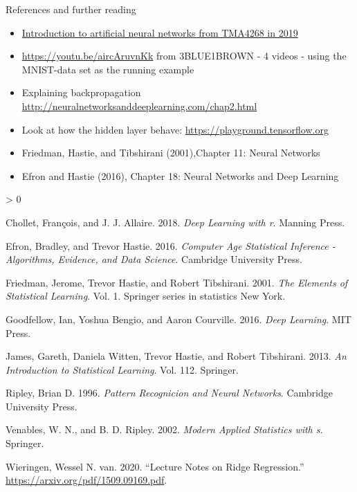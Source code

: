 \documentclass[
  ignorenonframetext,
]{beamer}
\providecommand{\tightlist}{%
  \setlength{\itemsep}{0pt}\setlength{\parskip}{0pt}}
\newlength{\cslhangindent}
\newenvironment{CSLReferences}[2] %
 {%
  \setlength{\parindent}{0pt}
  \ifodd #1 \everypar{\setlength{\hangindent}{\cslhangindent}}\ignorespaces\fi
  \ifnum #2 > 0
  \setlength{\parskip}{#2\baselineskip}
  \fi
 }%
 {}
\begin{document}
\begin{frame}{References and further reading}
\protect\hypertarget{references-and-further-reading}{}
\begin{itemize}
\tightlist
\item
  \href{https://www.math.ntnu.no/emner/TMA4268/2019v/11Nnet/11Nnet.html}{Introduction
  to artificial neural networks from TMA4268 in 2019}
\item
  \url{https://youtu.be/aircAruvnKk} from 3BLUE1BROWN - 4 videos - using
  the MNIST-data set as the running example
\item
  Explaining backpropagation
  \url{http://neuralnetworksanddeeplearning.com/chap2.html}
\item
  Look at how the hidden layer behave:
  \url{https://playground.tensorflow.org}
\item
  Friedman, Hastie, and Tibshirani (2001),Chapter 11: Neural Networks
\item
  Efron and Hastie (2016), Chapter 18: Neural Networks and Deep Learning
\end{itemize}

\hypertarget{refs}{}
\begin{CSLReferences}{1}{0}
\leavevmode\hypertarget{ref-kerasR}{}%
Chollet, François, and J. J. Allaire. 2018. \emph{Deep Learning with r}.
Manning Press.

\leavevmode\hypertarget{ref-casi}{}%
Efron, Bradley, and Trevor Hastie. 2016. \emph{Computer Age Statistical
Inference - Algorithms, Evidence, and Data Science}. Cambridge
University Press.

\leavevmode\hypertarget{ref-ESL}{}%
Friedman, Jerome, Trevor Hastie, and Robert Tibshirani. 2001. \emph{The
Elements of Statistical Learning}. Vol. 1. Springer series in statistics
New York.

\leavevmode\hypertarget{ref-goodfellow}{}%
Goodfellow, Ian, Yoshua Bengio, and Aaron Courville. 2016. \emph{Deep
Learning}. MIT Press.

\leavevmode\hypertarget{ref-ISL}{}%
James, Gareth, Daniela Witten, Trevor Hastie, and Robert Tibshirani.
2013. \emph{An Introduction to Statistical Learning}. Vol. 112.
Springer.

\leavevmode\hypertarget{ref-Ripley}{}%
Ripley, Brian D. 1996. \emph{Pattern Recognicion and Neural Networks}.
Cambridge University Press.

\leavevmode\hypertarget{ref-MASS}{}%
Venables, W. N., and B. D. Ripley. 2002. \emph{Modern Applied Statistics
with s}. Springer.

\leavevmode\hypertarget{ref-WNvW}{}%
Wieringen, Wessel N. van. 2020. {``Lecture Notes on Ridge Regression.''}
\url{https://arxiv.org/pdf/1509.09169.pdf}.

\end{CSLReferences}
\end{frame}
\end{document}
